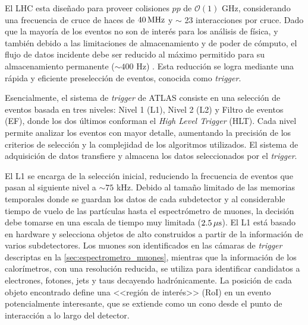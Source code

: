 El LHC esta diseñado para proveer colisiones $pp$ de $\mathcal{O}(1)$ GHz,
considerando una frecuencia de cruce de haces de $\unit[40]{MHz}$ y $\sim$ 23
interacciones por cruce. Dado que la mayoría de los eventos no son de interés
para los análisis de física, y también debido a las limitaciones de
almacenamiento y de poder de cómputo, el flujo de datos incidente debe ser
reducido al máximo permitido para su almacenamiento permanente ($\sim 400$ Hz)
\cite{Aad:2012xs}.
Esta reducción se logra mediante una rápida y eficiente preselección de eventos,
conocida como \emph{trigger}.

Esencialmente, el sistema de \emph{trigger} de ATLAS \cite{atlas} consiste en
una selección de eventos basada en tres niveles: Nivel 1 (L1), Nivel 2 (L2) y
Filtro de eventos (EF), donde los dos últimos conforman el \emph{High Level
  Trigger} (HLT). Cada nivel permite analizar los eventos con mayor detalle,
aumentando la precisión de los criterios de selección y la complejidad de los
algoritmos utilizados. El sistema de adquisición de datos transfiere y
almacena los datos seleccionados por el \emph{trigger}.

El L1 se encarga de la selección inicial, reduciendo la frecuencia de eventos
que pasan al siguiente nivel a $\sim 75$ kHz. Debido al tamaño limitado de las
memorias temporales donde se guardan los datos de cada subdetector y al
considerable tiempo de vuelo de las partículas hasta el espectrómetro de muones,
la decisión debe tomarse en una escala de tiempo muy limitada ($\unit[2.5]{\mu s}$).
El L1 está basado en hardware y selecciona objetos de alto {\pt}
construidos a partir de la información de varios subdetectores. Los muones son
identificados en las cámaras de \emph{trigger} descriptas en la
\cref{sec:espectrometro_muones}, mientras que la información de los
calorímetros, con una resolución reducida, se utiliza para identificar
candidatos a electrones, fotones, jets y taus decayendo hadrónicamente. La
posición de cada objeto encontrado define una <<región de interés>> (RoI) en
un evento potencialmente interesante, que se extiende como un cono desde el
punto de interacción a lo largo del detector.

